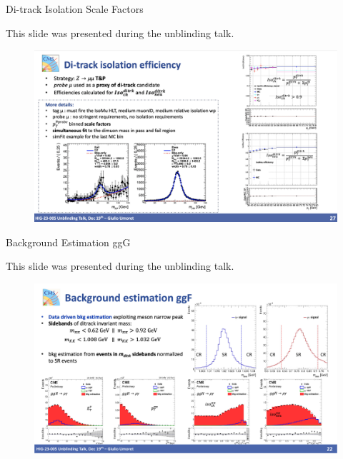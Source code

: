 \documentclass[9pt,aspectratio=1610]{beamer}
\begin{document}
\begin{frame}{Di-track Isolation Scale Factors}
	
	{\footnotesize This slide was presented during the unblinding talk.}
	\begin{figure}
		\centering
		\includegraphics[height=0.8\textheight]{figures/backup/isolation_scale_factors.png}
	\end{figure}
\end{frame}

\begin{frame}{Background Estimation ggG}
	
	{\footnotesize This slide was presented during the unblinding talk.}
	\begin{figure}
		\centering
		\includegraphics[height=0.8\textheight]{figures/backup/BDT_ggH_bkg_SFs.pdf}
	\end{figure}
\end{frame}
\end{document}
